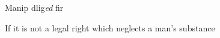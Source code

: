 \documentclass[11pt]{article}
\begin{document}
\begin{pages}
  \Pages
\end{pages}

\begin{pages}
\begin{Leftside}
    \beginnumbering\pstart
    Manip dlig\emph{ed}   fir
    
    \pend
  \endnumbering
  \end{Leftside}

\begin{Rightside}
    \beginnumbering\pstart
    If it is not a legal right which neglects a man's substance
    \pend
    \endnumbering
  \end{Rightside}

  \Pages
\end{pages}
\end{document}
